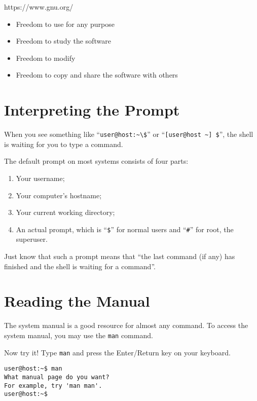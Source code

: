 \documentclass{extbook}
\begin{document}
https://www.gnu.org/

\begin{itemize}
\item Freedom to use for any purpose
\item Freedom to study the software
\item Freedom to modify
\item Freedom to copy and share the software with others
\end{itemize}

\section{Interpreting the Prompt}

When you see something like ``\verb|user@host:~\$|'' or ``\verb|[user@host ~] $|'', the shell is waiting for you to type a command.

The default prompt on most systems consists of four parts:
\begin{enumerate}
\item Your username;
\item Your computer's hostname;
\item Your current working directory;
\item An actual prompt, which is ``\verb|$|'' for normal users and ``\verb|#|'' for root, the superuser.
\end{enumerate}


Just know that such a prompt means that ``the last command (if any) has finished and the shell is waiting for a command''.

\section{Reading the Manual}

The system manual is a good resource for almost any command. To access the system manual, you may use the \verb|man| command.

Now try it!  Type \verb|man| and press the Enter/Return key on your keyboard.
\begin{verbatim}
user@host:~$ man
What manual page do you want?
For example, try 'man man'.
user@host:~$
\end{verbatim}
\end{document}
